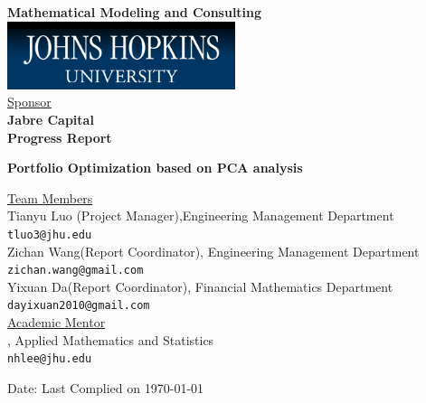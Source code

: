 \documentclass[oneside,12pt]{report}
\begin{document}
\def\thefootnote{\fnsymbol{footnote}}

\thispagestyle{empty}

\def\shiftdowna{0.32in}  %
\def\shiftdownb{0.22in}  %


\begin{center}
\textbf{{\large Mathematical Modeling and Consulting }}\\

\vspace \shiftdowna
\includegraphics[width=0.5\textwidth]{jhu.png}\\

\vspace \shiftdowna
\underline {Sponsor}\\ 
\vspace{5pt}
\textbf{\large Jabre Capital} \\
\vspace\shiftdowna
\textbf{{Progress Report}}

\vspace \shiftdowna
\textbf{{\Large Portfolio Optimization based on PCA analysis}}

\vspace{0.35in}
\underline {Team Members}\\
\vspace{5pt}
Tianyu Luo (Project Manager),Engineering Management Department\\
\texttt{tluo3@jhu.edu} \\
\vspace{10pt}
Zichan Wang(Report Coordinator), Engineering Management Department\\
\texttt{zichan.wang@gmail.com}\\
\vspace{10pt}
Yixuan Da(Report Coordinator), Financial Mathematics Department\\
\texttt{dayixuan2010@gmail.com}\\

\vspace \shiftdownb
\underline {Academic Mentor} \\
\vspace{5pt}
, Applied Mathematics and Statistics\\
\texttt{nhlee@jhu.edu}


\vspace \shiftdowna
Date: Last Complied on \today

\end{center}
\end{document}
